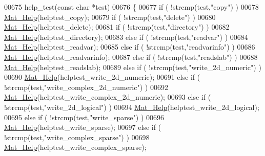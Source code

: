 \begin{DoxyCode}
{{00675 help\_test(\textcolor{keyword}{const} \textcolor{keywordtype}{char} *test)
00676 \{
00677     \textcolor{keywordflow}{if} ( !strcmp(test,\textcolor{stringliteral}{"copy"}) )
00678         \hyperlink{group__mat__util_gaa4039c185e807ed2e9682b66fe2ea331}{Mat\_Help}(helptest\_copy);
00679     \textcolor{keywordflow}{if} ( !strcmp(test,\textcolor{stringliteral}{"delete"}) )
00680         \hyperlink{group__mat__util_gaa4039c185e807ed2e9682b66fe2ea331}{Mat\_Help}(helptest\_delete);
00681     \textcolor{keywordflow}{if} ( !strcmp(test,\textcolor{stringliteral}{"directory"}) )
00682         \hyperlink{group__mat__util_gaa4039c185e807ed2e9682b66fe2ea331}{Mat\_Help}(helptest\_directory);
00683     \textcolor{keywordflow}{else} \textcolor{keywordflow}{if} ( !strcmp(test,\textcolor{stringliteral}{"readvar"}) )
00684         \hyperlink{group__mat__util_gaa4039c185e807ed2e9682b66fe2ea331}{Mat\_Help}(helptest\_readvar);
00685     \textcolor{keywordflow}{else} \textcolor{keywordflow}{if} ( !strcmp(test,\textcolor{stringliteral}{"readvarinfo"}) )
00686         \hyperlink{group__mat__util_gaa4039c185e807ed2e9682b66fe2ea331}{Mat\_Help}(helptest\_readvarinfo);
00687     \textcolor{keywordflow}{else} \textcolor{keywordflow}{if} ( !strcmp(test,\textcolor{stringliteral}{"readslab"}) )
00688         \hyperlink{group__mat__util_gaa4039c185e807ed2e9682b66fe2ea331}{Mat\_Help}(helptest\_readslab);
00689     \textcolor{keywordflow}{else} \textcolor{keywordflow}{if} ( !strcmp(test,\textcolor{stringliteral}{"write\_2d\_numeric"}) )
00690         \hyperlink{group__mat__util_gaa4039c185e807ed2e9682b66fe2ea331}{Mat\_Help}(helptest\_write\_2d\_numeric);
00691     \textcolor{keywordflow}{else} \textcolor{keywordflow}{if} ( !strcmp(test,\textcolor{stringliteral}{"write\_complex\_2d\_numeric"}) )
00692         \hyperlink{group__mat__util_gaa4039c185e807ed2e9682b66fe2ea331}{Mat\_Help}(helptest\_write\_complex\_2d\_numeric);
00693     \textcolor{keywordflow}{else} \textcolor{keywordflow}{if} ( !strcmp(test,\textcolor{stringliteral}{"write\_2d\_logical"}) )
00694         \hyperlink{group__mat__util_gaa4039c185e807ed2e9682b66fe2ea331}{Mat\_Help}(helptest\_write\_2d\_logical);
00695     \textcolor{keywordflow}{else} \textcolor{keywordflow}{if} ( !strcmp(test,\textcolor{stringliteral}{"write\_sparse"}) )
00696         \hyperlink{group__mat__util_gaa4039c185e807ed2e9682b66fe2ea331}{Mat\_Help}(helptest\_write\_sparse);
00697     \textcolor{keywordflow}{else} \textcolor{keywordflow}{if} ( !strcmp(test,\textcolor{stringliteral}{"write\_complex\_sparse"}) )
00698         \hyperlink{group__mat__util_gaa4039c185e807ed2e9682b66fe2ea331}{Mat\_Help}(helptest\_write\_complex\_sparse);
}}
\end{DoxyCode}
